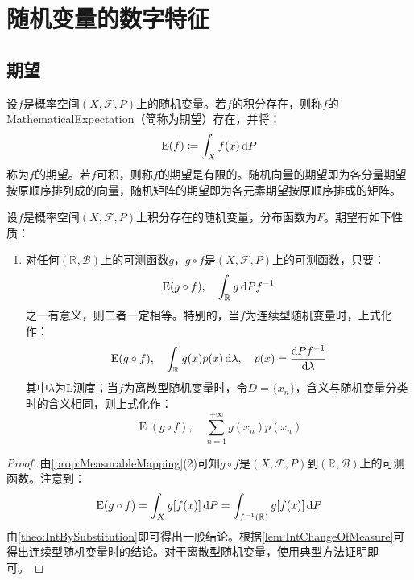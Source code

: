 \section{随机变量的数字特征}

\subsection{期望}
\begin{definition}
	设$f$是概率空间$(X,\mathscr{F},P)$上的随机变量。若$f$的积分存在，则称$f$的\gls{MathematicalExpectation}（简称为期望）存在，并将：
	\begin{equation*}
		\operatorname{E}(f)\coloneq\int_{X}f(x)\mathop{}\!\mathrm{d} P
	\end{equation*}
	称为$f$的期望。若$f$可积，则称$f$的期望是有限的。随机向量的期望即为各分量期望按原顺序排列成的向量，随机矩阵的期望即为各元素期望按原顺序排成的矩阵。
\end{definition}
\begin{property}
	设$f$是概率空间$(X,\mathscr{F},P)$上积分存在的随机变量，分布函数为$F$。期望有如下性质：
	\begin{enumerate}
		\item 对任何$(\mathbb{R}^{},\mathcal{B})$上的可测函数$g$，$g\circ f$是$(X,\mathscr{F},P)$上的可测函数，只要：
		\begin{equation*}
			\operatorname{E}(g\circ f),\quad\int_{\mathbb{R}^{}}g\mathop{}\!\mathrm{d} Pf^{-1}
		\end{equation*}
		之一有意义，则二者一定相等。特别的，当$f$为连续型随机变量时，上式化作：
		\begin{equation*}
			\operatorname{E}(g\circ f),\quad\int_{\mathbb{R}^{}}g(x)p(x)\mathop{}\!\mathrm{d}\lambda,\quad p(x)=\frac{\mathop{}\!\mathrm{d} Pf^{-1}}{\mathop{}\!\mathrm{d}\lambda}
		\end{equation*}
		其中$\lambda$为L测度；当$f$为离散型随机变量时，令$D=\{x_n\}$，含义与随机变量分类时的含义相同，则上式化作：
		\begin{equation*}
				\operatorname{E}(g\circ f),\quad\sum_{n=1}^{+\infty}g(x_n)p(x_n)
		\end{equation*}
	\end{enumerate}
\end{property}
\begin{proof}
	由\cref{prop:MeasurableMapping}(2)可知$g\circ f$是$(X,\mathscr{F},P)$到$(\mathbb{R}^{},\mathcal{B})$上的可测函数。注意到：
	\begin{equation*}
		\operatorname{E}(g\circ f)=\int_{X}g[f(x)]\mathop{}\!\mathrm{d} P=\int_{f^{-1}(\mathbb{R}^{})}g[f(x)]\mathop{}\!\mathrm{d} P
	\end{equation*}
	由\cref{theo:IntBySubstitution}即可得出一般结论。根据\cref{lem:IntChangeOfMeasure}可得出连续型随机变量时的结论。对于离散型随机变量，使用典型方法证明即可。
\end{proof}
